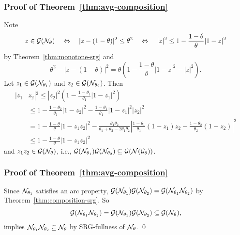 \documentclass[10pt,mathserif]{beamer}
\begin{document}
\begin{frame}
\frametitle{Proof of Theorem~\ref{thm:avg-composition}}
Note
\[
z\in {\mathcal{G}}({\mathcal{N}}_\theta)
\quad\Leftrightarrow\quad
|z-(1-\theta)|^2\le \theta^2
\quad\Leftrightarrow\quad
|z|^2\le 1-\frac{1-\theta}{\theta}|1-z|^2
\]
by Theorem~\ref{thm:monotone-srg} and 
\[
\theta^2-|z-(1-\theta)|^2
=\theta\left(
1-\frac{1-\theta}{\theta}|1-z|^2-|z|^2
\right).
\]
Let $z_1\in{\mathcal{G}}({\mathcal{N}}_{\theta_1})$ and $z_2\in{\mathcal{G}}({\mathcal{N}}_{\theta_2})$.
Then
\begingroup\makeatletter\def\f@size{9}\check@mathfonts
\begin{align*}
|z_1&z_2|^2\le 
|z_2|^2\left(
1-\frac{1-\theta_1}{\theta_1}|1-z_1|^2
\right)\\
&\le 
1-\frac{1-\theta_2}{\theta_1}|1-z_2|^2-\frac{1-\theta_1}{\theta_1}|1-z_1|^2|z_2|^2\\
&=
1-\frac{1-\theta}{\theta}|1-z_1z_2|^2-
\frac{\theta_1\theta_2}{\theta_1+\theta_2-2\theta_1\theta_2}
\left|
\frac{1-\theta_1}{\theta_1}(1-z_1)z_2-\frac{1-\theta_2}{\theta_2}(1-z_2)
\right|^2\\
&\le
1-\frac{1-\theta}{\theta}|1-z_1z_2|^2
\end{align*}
\endgroup
and $z_1z_2\in {\mathcal{G}}({\mathcal{N}}_{\theta})$, i.e., ${\mathcal{G}}({\mathcal{N}}_{\theta_1}){\mathcal{G}}({\mathcal{N}}_{\theta_2})\subseteq {\mathcal{G}}({\mathcal{N}}({\mathcal{G}}_\theta))$.
\end{frame}


\begin{frame}
\frametitle{Proof of Theorem~\ref{thm:avg-composition}}
Since ${\mathcal{N}}_{\theta_1}$ satisfies an arc property, ${\mathcal{G}}({\mathcal{N}}_{\theta_1}){\mathcal{G}}({\mathcal{N}}_{\theta_2})={\mathcal{G}}({\mathcal{N}}_{\theta_1}{\mathcal{N}}_{\theta_2})$ by Theorem~\ref{thm:composition-srg}.
So 
\[
{\mathcal{G}}({\mathcal{N}}_{\theta_1}{\mathcal{N}}_{\theta_2})={\mathcal{G}}({\mathcal{N}}_{\theta_1}){\mathcal{G}}({\mathcal{N}}_{\theta_2})\subseteq {\mathcal{G}}({\mathcal{N}}_\theta),
\]
implies ${\mathcal{N}}_{\theta_1}{\mathcal{N}}_{\theta_2}\subseteq {\mathcal{N}}_\theta$ by SRG-fullness of ${\mathcal{N}}_\theta$.
\qed
\end{frame}
\end{document}
